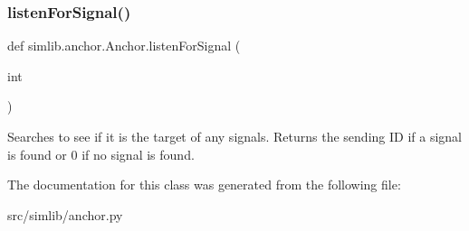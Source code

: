 \subsubsection{\texorpdfstring{listen\+For\+Signal()}{listenForSignal()}}
{\footnotesize\ttfamily def simlib.\+anchor.\+Anchor.\+listen\+For\+Signal (\begin{DoxyParamCaption}\item[{}]{int }\end{DoxyParamCaption})}

\begin{DoxyVerb}Searches to see if it is the target of any signals. Returns the sending ID
if a signal is found or 0 if no signal is found.
\end{DoxyVerb}
 

The documentation for this class was generated from the following file\+:\begin{DoxyCompactItemize}
\item 
src/simlib/anchor.\+py\end{DoxyCompactItemize}
